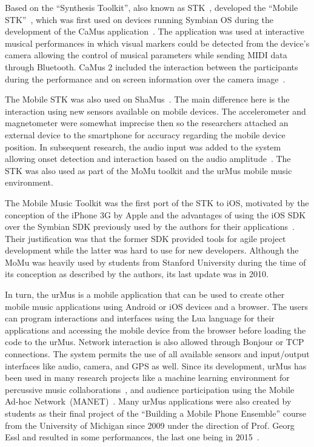 Based on the ``Synthesis Toolkit'', also known as STK~\citep{Cook1999stk}, \citeauthor{Essl2006mobilestk} developed the ``Mobile STK''~\citep{Essl2006mobilestk}, which was first used on devices running  Symbian OS during the development of the CaMus application~\citep{Rohs2006camus}.
The application was used at interactive musical performances in which visual markers could be detected from the device's camera allowing the control of musical parameters while sending MIDI data through Bluetooth.
CaMus 2 included the interaction between the participants during the performance and on screen information over the camera image~\citep{Rohs2007camus2}.

The Mobile STK was also used on ShaMus~\citep{Essl2007shamus}.
The main difference here is the interaction using new sensors available on mobile devices.
The accelerometer and magnetometer were somewhat imprecise then so the researchers attached an external device to the smartphone for accuracy regarding the mobile device position.
In subsequent research, the audio input was added to the system allowing onset detection and interaction based on the audio amplitude~\citep{Misra2008microphone}. 
The STK was also used as part of the MoMu toolkit and the urMus mobile music environment. 

The Mobile Music Toolkit was the first port of the STK to iOS, motivated by the conception of the iPhone 3G by Apple and the advantages of using the iOS SDK over the Symbian SDK previously used by the authors for their applications~\citep{Bryan2010momu}.
Their justification was that the former SDK provided tools for agile project development while the latter was hard to use for new developers.
Although the MoMu was heavily used by students from Stanford University during the time of its conception as described by the authors, its last update was in 2010.

In turn, the urMus is a mobile application that can be used to create other mobile music applications using Android or iOS devices and a browser.
The users can program interactions and interfaces using the Lua language for their applications and accessing the mobile device from the browser before loading the code to the urMus.
Network interaction is also allowed through Bonjour or TCP connections. 
The system permits the use of all available sensors and input/output interfaces like audio, camera, and GPS as well.
Since its development, urMus has been used in many research projects like a machine learning environment for percussive music collaborations~\citep{Derbinsky2012exploring}, and audience participation using the Mobile Ad-hoc Network~(MANET)~\citep{Lee2014manet}.
Many urMus applications were also created by students as their final project of the ``Building a Mobile Phone Ensemble'' course from the University of Michigan since 2009 under the direction of Prof. Georg Essl and resulted in some performances, the last one being in 2015~\citep{Michigan2017mobilephoneensempleperformance}.

